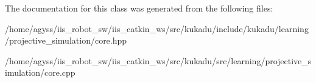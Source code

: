 The documentation for this class was generated from the following files\+:\begin{DoxyCompactItemize}
\item 
/home/agyss/iis\+\_\+robot\+\_\+sw/iis\+\_\+catkin\+\_\+ws/src/kukadu/include/kukadu/learning/projective\+\_\+simulation/core.\+hpp\item 
/home/agyss/iis\+\_\+robot\+\_\+sw/iis\+\_\+catkin\+\_\+ws/src/kukadu/src/learning/projective\+\_\+simulation/core.\+cpp\end{DoxyCompactItemize}
